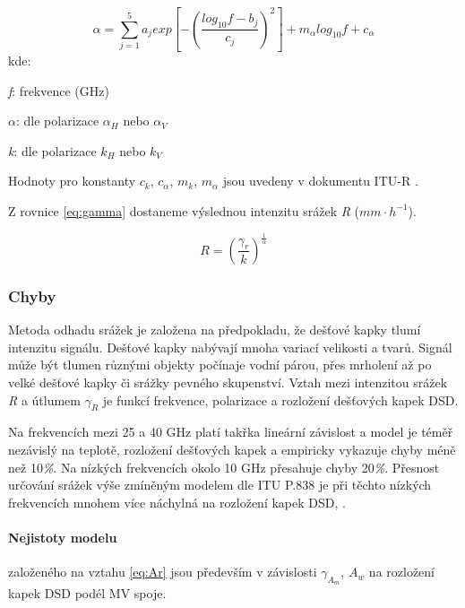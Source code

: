 \documentclass[a4paper,12pt,oneside]{report}
\begin{document}
\begin{equation}
\alpha=\sum_{j=1}^{5} a_{j} exp\left [ -\left ( \frac{log_{10}f-b_{j}}{c_{j}} \right )^{2} \right ]+m{_{\alpha }}log_{10}f+c_{\alpha }
\end{equation} 
kde:

\emph{f}: frekvence (GHz)

\emph{$\alpha$}:  dle polarizace \emph{$\alpha_{H}$} nebo \emph{$\alpha_{V}$}

\emph{k}: dle polarizace  \emph{$k_{H}$} nebo \emph{$k_{V}$}

{\raggedright{}Hodnoty pro  konstanty  $c_{k}$, $c_{\alpha}$, $m_{k}$, $m_{\alpha }$  jsou uvedeny v dokumentu 
  ITU-R \cite{itu}.}  \bigskip

{\raggedright{}  Z rovnice \eqref{eq:gamma} dostaneme
  výslednou intenzitu srážek \emph{R} ($mm \cdot h^{-1}$). }


\begin{equation}
R=\left ( \frac{\gamma_{r}}{k} \right )^{\frac{1}{\alpha }}
\end{equation}


\subsubsection{Chyby}
\label{subsec:chyby}
Metoda odhadu srážek je založena na předpokladu, že dešťové kapky
tlumí intenzitu signálu. Dešťové kapky nabývají mnoha variací
velikosti a tvarů. Signál může být tlumen různými objekty počínaje vodní
párou, přes mrholení až po velké dešťové
kapky či srážky pevného skupenství. Vztah mezi intenzitou srážek \emph{R} a útlumem
\emph{$\gamma_{R} $} je funkcí frekvence, polarizace a rozložení
dešťových kapek   \acs{DSD}.

Na frekvencích mezi 25 a 40 GHz platí takřka lineární závislost a
model je téměř nezávislý na teplotě, rozložení dešťových kapek a
empiricky vykazuje chyby méně než 10\emph{\%}. Na nízkých
frekvencích okolo 10 GHz přesahuje chyby 20\emph{\%}. Přesnost
určování srážek výše zmíněným modelem dle ITU P.838 je při těchto
nízkých frekvencích mnohem více náchylná na rozložení
kapek   \acs{DSD}, \cite{dsd}.


\paragraph*{Nejistoty modelu} založeného na vztahu \eqref{eq:Ar} jsou
především v závislosti \emph{$\gamma_{A_{m}} $}, \emph{$A_{w} $} na
rozložení kapek   \acs{DSD} podél MV spoje.
\end{document}
